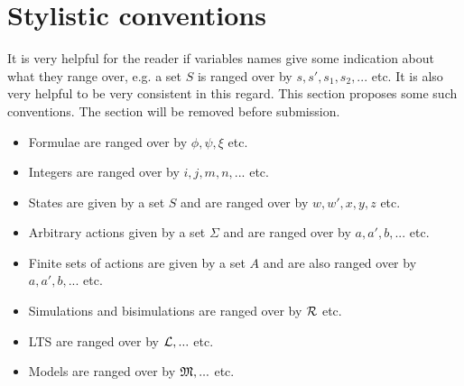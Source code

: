 \section{Stylistic conventions}

It is very helpful for the reader if variables names give some
indication about what they range over, e.g. a set $S$ is ranged over
by $s, s', s_1, s_2, ...$ etc.  It is also very helpful to be very
consistent in this regard.  This section proposes some such
conventions. The section will be removed before submission.

\begin{itemize}

\item Formulae  are ranged over by $\phi, \psi, \xi$ etc.
\item Integers are ranged over by $i, j, m, n, ...$ etc.
\item States are given by a set $S$ and  are ranged over by $w, w', x, y, z$ etc.
\item Arbitrary actions given by a set $\Sigma$ and are ranged over by $a, a', b, ...$ etc.
\item Finite sets of actions are given by a set $A$ and are also ranged over by $a, a', b, ...$ etc.
\item Simulations and bisimulations are ranged over by $\mathcal{R}$ etc.
\item LTS are ranged over by $\mathcal{L}, ...$ etc.
\item Models are ranged over by $\mathfrak{M}, ...$ etc.

\end{itemize}
